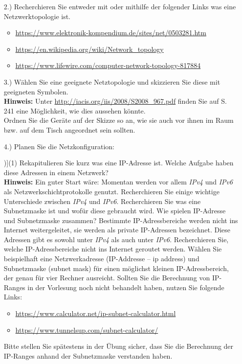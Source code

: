 \documentclass[paper=a4,fontsize=11pt]{scrartcl}%
\numberwithin{equation}{section}
\begin{document}
\begin{itemize}
	\item[2.)] Recherchieren Sie entweder mit \cite[S. 461ff]{Kurose2012} oder mithilfe der folgender Links was eine Netzwerktopologie ist.
	\begin{itemize}
		\item \url{https://www.elektronik-kompendium.de/sites/net/0503281.htm}
		\item \url{https://en.wikipedia.org/wiki/Network_topology}
		\item \url{https://www.lifewire.com/computer-network-topology-817884}
	\end{itemize}
	\item[3.)] Wählen Sie eine geeignete Netztopologie und skizzieren Sie diese mit geeigneten Symbolen.\\ \textbf{Hinweis:} Unter \url{http://iacis.org/iis/2008/S2008_967.pdf} finden Sie auf S. 241 eine Möglichkeit, wie dies aussehen könnte.\\
	Ordnen Sie die Geräte auf der Skizze so an, wie sie auch vor ihnen im Raum bzw. auf dem Tisch angeordnet sein sollten.
	\item[4.)] Planen Sie die Netzkonfiguration:
\begin{tasks}[counter-format=(tsk[r])](1)	
	\task Rekapitulieren Sie kurz was eine IP-Adresse ist. Welche Aufgabe haben diese Adressen in einem Netzwerk?\\
	\textbf{Hinweis:} Ein guter Start wäre: \cite[S. 331ff]{Kurose2012}
	\task Momentan werden vor allem \emph{IPv4} und \emph{IPv6} als Netzwerkschichtprotokolle genutzt. Recherchieren Sie einige wichtige Unterschiede zwischen \emph{IPv4} und \emph{IPv6}.
	\task Recherchieren Sie was eine Subnetzmaske ist und wofür diese gebraucht wird.
	\task Wie spielen IP-Adresse und Subnetzmaske zusammen?
	\task Bestimmte IP-Adressbereiche werden nicht ins Internet weitergeleitet, sie werden als private IP-Adressen bezeichnet. Diese Adressen gibt es sowohl unter \emph{IPv4} als auch unter \emph{IPv6}. Recherchieren Sie, welche IP-Adressbereiche nicht ins Internet geroutet werden.
	\task Wählen Sie beispielhaft eine Netzwerkadresse (IP-Addresse -- ip address) und Subnetzmaske (subnet mask) für einen möglichst kleinen IP-Adressbereich, der genau für vier Rechner ausreicht.
	\task Sollten Sie die Berechnung von IP-Ranges in der Vorlesung noch nicht behandelt haben, nutzen Sie folgende Links:
	\begin{itemize}
		\item \url{https://www.calculator.net/ip-subnet-calculator.html}
		\item \url{https://www.tunnelsup.com/subnet-calculator/}
	\end{itemize}
	Bitte stellen Sie spätestens in der Übung sicher, dass Sie die Berechnung der IP-Ranges anhand der Subnetzmaske verstanden haben.
\end{tasks} 
\end{itemize}
\end{document}
